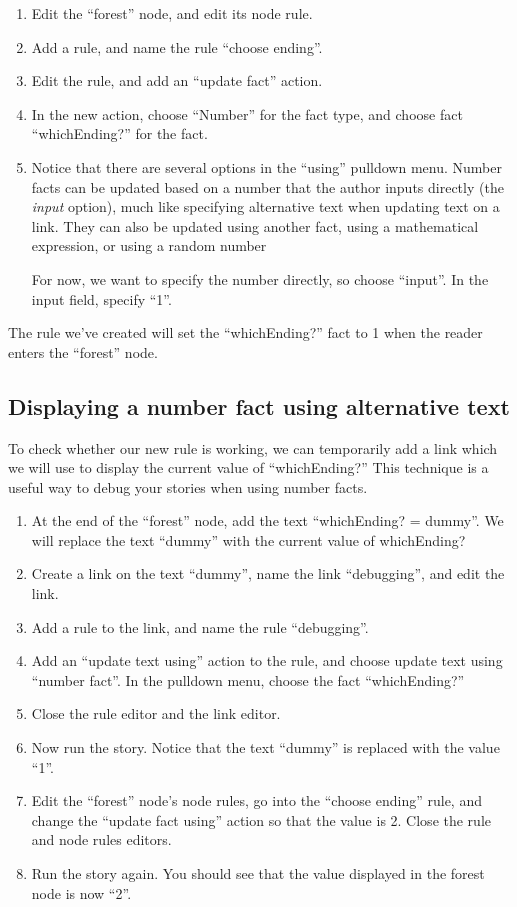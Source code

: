 \documentclass{article}
\begin{document}
\begin{enumerate}
    \item Edit the ``forest'' node, and edit its node rule.
    \item Add a rule, and name the rule ``choose ending''.
    \item Edit the rule, and add an ``update fact'' action.
    \item In the new action, choose ``Number'' for the fact type, and 
    choose fact ``whichEnding?'' for the fact.
    \item Notice that there are several options in the ``using'' 
    pulldown menu. Number facts can be updated based on a number 
    that the author inputs directly (the \textit{input} option), much 
    like specifying alternative text when updating text on a link. 
    They can also be updated using another fact, using a mathematical 
    expression, or using a random number
    
    For now, we want to specify the number directly, so choose 
    ``input''. In the input field, specify ``1''.
\end{enumerate}

\noindent The rule we've created will set the ``whichEnding?'' fact to 1 when 
the reader enters the ``forest'' node. 

\subsection{Displaying a number fact using alternative text}

To check whether our new rule is 
working, we can temporarily add a link which we will use to display 
the current value of ``whichEnding?'' This technique is a useful way 
to debug your stories when using number facts.

\begin{enumerate}
    \item At the end of the ``forest'' node, add the text 
    ``whichEnding? =  
    dummy''. We will replace the text ``dummy'' with the current 
    value of whichEnding?
    \item Create a link on the text ``dummy'', name the link 
    ``debugging'', and edit the link.
    \item Add a rule to the link, and name the rule ``debugging''.
    \item Add an ``update text using'' action to the rule, and choose 
    update text using ``number fact''. In the pulldown menu, choose 
    the fact ``whichEnding?''
    \item Close the rule editor and the link editor.
    \item Now run the story. Notice that the text ``dummy'' is 
    replaced with the value ``1''.
    \item Edit the ``forest'' node's node rules, go into the ``choose 
    ending'' rule, and change the ``update fact using'' action so 
    that the value is 2. Close the rule and node rules editors.
    \item Run the story again. You should see that the value 
    displayed in the forest node is now ``2''.
\end{enumerate}
\end{document}
